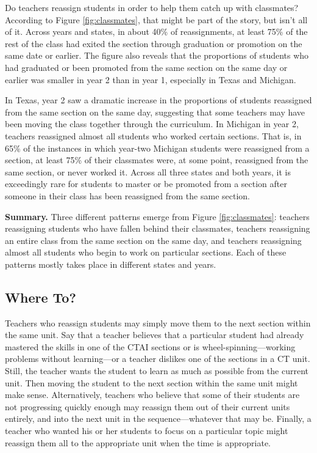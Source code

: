 \documentclass[notitlepage,12pt]{jedm}\usepackage[]{graphicx}\usepackage[]{color}
\begin{document}
Do teachers reassign students in order to help them catch up with classmates?
According to Figure \ref{fig:classmates}, that might be part of the
story, but isn't all of it.
Across years and states, in about 40\% of
reassignments, at least 75\% of the rest of the class had exited the
section through graduation or promotion on the same date or earlier.
The figure also reveals that the proportions of students who had graduated or been
promoted from the same section on the same day or earlier was smaller in year 2
than in year 1, especially in Texas and Michigan.

In Texas, year 2 saw a dramatic increase in the proportions of
students reassigned from the same section on the same day, suggesting
that some teachers may have been moving the class together through the
curriculum.
In Michigan in year 2, teachers reassigned almost all students who
worked certain sections.
That is, in 65\% of the instances in which year-two Michigan
students were reassigned from a section, at least 75\% of their
classmates were, at some point, reassigned from the same section, or
never worked it.
Across all three states and both years, it is exceedingly rare for
students to master or be promoted from a section after someone in
their class has been reassigned from the same section.

\textbf{Summary.} Three different patterns emerge from Figure
\ref{fig:classmates}: teachers reassigning students who have fallen
behind their classmates, teachers reassigning an entire class from the
same section on the same day, and teachers reassigning almost all
students who begin to work on particular sections.
Each of these patterns mostly takes place in different states and
years.

\subsection{Where To?}

Teachers who reassign students may simply move them to the next
section within the same unit.
Say that a teacher believes that a particular student had already mastered
the skills in one of the CTAI sections or is wheel-spinning---working
problems without learning---or a teacher dislikes one of the sections in a CT unit.
Still, the teacher wants the student to learn as much as possible from
the current unit.
Then moving the student to the next section within the same unit might
make sense.
Alternatively, teachers who believe that some of their students are
not progressing quickly enough may reassign them out of their current
units entirely, and into the next unit in the sequence---whatever that
may be.
Finally, a teacher who wanted his or her students to focus on a
particular topic might reassign them all to the appropriate unit
when the time is appropriate.
\end{document}
